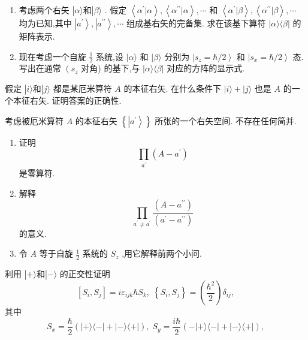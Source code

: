 \begin{problemset}
\begin{enumerate}
	\end{enumerate}
	\item
	\begin{enumerate}
		\item 考虑两个右矢 $\left| {\alpha \rangle \text{和}}\right| \beta \rangle$ . 假定 $\left\langle {{\alpha }^{\prime } | \alpha }\right\rangle ,\left\langle {{\alpha }^{\prime \prime } | \alpha }\right\rangle ,\cdots$ 和 $\left\langle {{\alpha }^{\prime } | \beta }\right\rangle ,\left\langle {{\alpha }^{\prime \prime } | \beta }\right\rangle ,\cdots$ 均为已知,其中 $\left| {a}^{\prime }\right\rangle ,\left| {a}^{\prime \prime }\right\rangle ,\cdots$ 组成基右矢的完备集. 求在该基下算符 $|\alpha \rangle \langle \beta |$ 的矩阵表示.
		\item 现在考虑一个自旋 $\frac{1}{2}$ 系统,设 $|\alpha \rangle$ 和 $|\beta \rangle$ 分别为 $\left| {{s}_{z} = \hbar /2}\right\rangle$ 和 $\left| {{s}_{x} = \hbar /2}\right\rangle$ 态. 写出在通常 $\left( {s}_{z}\right.$ 对角) 的基下,与 $\left| {\alpha \rangle \langle \beta }\right|$ 对应的方阵的显示式.
	\end{enumerate}
	\item 假定 $\left| {i\rangle \text{和}}\right| j\rangle$ 都是某厄米算符 $A$ 的本征右矢. 在什么条件下 $\left| {i\rangle + }\right| j\rangle$ 也是 $A$ 的一个本征右矢. 证明答案的正确性.
	\item 考虑被厄米算符 $A$ 的本征右矢 $\left\{ \left| {a}^{\prime }\right\rangle \right\}$ 所张的一个右矢空间. 不存在任何简并.
	\begin{enumerate}
		\item 证明
		$$
		\mathop{\prod }\limits_{{a}^{\prime }}\left( {A - {a}^{\prime }}\right)
		$$
		是零算符.
		\item 解释
		$$
		\mathop{\prod }\limits_{{{a}^{\prime } \neq {a}^{\prime }}}\frac{\left( A - {a}^{\prime \prime }\right) }{\left( {a}^{\prime } - {a}^{\prime \prime }\right) }
		$$
		的意义.
		\item 令 $A$ 等于自旋 $\frac{1}{2}$ 系统的 ${S}_{z}$ ,用它解释前两个小问.
	\end{enumerate}
	\item 利用 $\left| {+\rangle \text{和}}\right| - \rangle$ 的正交性证明
	$$
	\left\lbrack {{S}_{i},{S}_{j}}\right\rbrack = i{\varepsilon }_{ijk}\hbar {S}_{k},\;\left\{ {{S}_{i},{S}_{j}}\right\} = \left( \frac{{\hbar }^{2}}{2}\right) {\delta }_{ij},
	$$
	其中
	$$
	{S}_{x} = \frac{\hbar }{2}\left( {\left| {+\rangle \langle - }\right| + \left| {-\rangle \langle + }\right| }\right) ,\;{S}_{y} = \frac{i\hbar }{2}\left( {-\left| {+\rangle \langle - }\right| + \left| {-\rangle \langle + }\right| }\right) ,
$$
\end{problemset}
